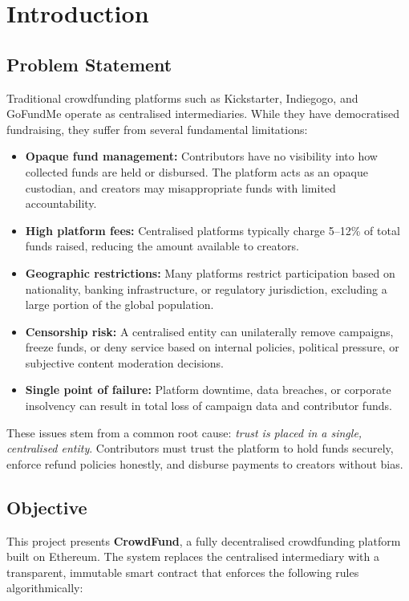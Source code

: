 \section{Introduction}
\label{sec:introduction}

\subsection{Problem Statement}

Traditional crowdfunding platforms such as Kickstarter, Indiegogo, and GoFundMe operate as centralised intermediaries. While they have democratised fundraising, they suffer from several fundamental limitations:

\begin{itemize}[leftmargin=1.5em]
    \item \textbf{Opaque fund management:} Contributors have no visibility into how collected funds are held or disbursed. The platform acts as an opaque custodian, and creators may misappropriate funds with limited accountability.
    \item \textbf{High platform fees:} Centralised platforms typically charge 5--12\% of total funds raised, reducing the amount available to creators.
    \item \textbf{Geographic restrictions:} Many platforms restrict participation based on nationality, banking infrastructure, or regulatory jurisdiction, excluding a large portion of the global population.
    \item \textbf{Censorship risk:} A centralised entity can unilaterally remove campaigns, freeze funds, or deny service based on internal policies, political pressure, or subjective content moderation decisions.
    \item \textbf{Single point of failure:} Platform downtime, data breaches, or corporate insolvency can result in total loss of campaign data and contributor funds.
\end{itemize}

These issues stem from a common root cause: \emph{trust is placed in a single, centralised entity}. Contributors must trust the platform to hold funds securely, enforce refund policies honestly, and disburse payments to creators without bias.

\subsection{Objective}

This project presents \textbf{CrowdFund}, a fully decentralised crowdfunding platform built on Ethereum. The system replaces the centralised intermediary with a transparent, immutable smart contract that enforces the following rules algorithmically:

